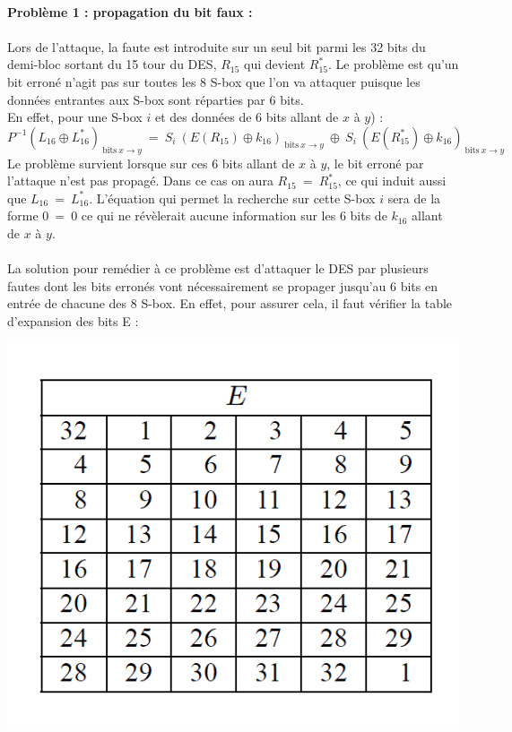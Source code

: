 			\paragraph{Problème 1 : propagation du bit faux :}
				\paragraph{} Lors de l'attaque, la faute est introduite sur un seul bit parmi les 32 bits du demi-bloc sortant du 15 tour du DES, $R_{15}$ qui devient $R_{15}^{*}$. Le problème est qu'un bit erroné n'agit pas sur toutes les 8 S-box que l'on va attaquer puisque les données entrantes aux S-box sont réparties par 6 bits.\\
				En effet, pour une S-box $i$ et des données de 6 bits allant de $x$ à $y$) :
				\[
				P^{-1}(L_{16} \oplus L_{16}^{*})_{\ \textrm{bits}\ x \to y}\ = \ S_{i}\ (E(R_{15}) \oplus k_{16})_{\ \textrm{bits}\ x \to y}\ \oplus \ S_{i}\ (E(R_{15}^{*}) \oplus k_{16})_{\ \textrm{bits}\ x \to y}
				\]
				Le problème survient lorsque sur ces 6 bits allant de $x$ à $y$, le bit erroné par l'attaque n'est pas propagé. Dans ce cas on aura $R_{15}\ =\ R_{15}^{*}$, ce qui induit aussi que $L_{16}\ =\ L_{16}^{*}$. L'équation qui permet la recherche sur cette S-box $i$ sera de la forme $0\ =\ 0$ ce qui ne révèlerait aucune information sur les 6 bits de $k_{16}$ allant de $x$ à $y$.
				
				\paragraph{} La solution pour remédier à ce problème est d'attaquer le DES par plusieurs fautes dont les bits erronés vont nécessairement se propager jusqu'au 6 bits en entrée de chacune des 8 S-box. En effet, pour assurer cela, il faut vérifier la table d'expansion des bits E :

				\begin{center}\includegraphics[scale=0.5]{E.png}\end{center}
				
